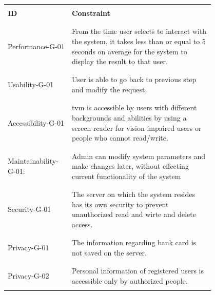 \documentclass[a4paper,12pt]{report}
\begin{document}
\begin{longtable}{ | p{0.2\linewidth} | p{0.6\linewidth} | }
	\hline
	
	 & \\ %
	\centering \textbf{ID}  & \textbf{Constraint} \\
	& \\ %
	\hline
	
	
	& \\ %
	Performance-G-01 & From the time user selects to interact with the system, it takes less than or equal to 5 seconds on average for the system to display the result to that user. \\
	& \\ %
	\hline
	
	& \\ %
	Usability-G-01 & User is able to go back to previous step and modify the request. \\
		& \\ %
	\hline
	
	& \\ %
	Accessibility-G-01 & \gls{tvm} is accessible by users with different backgrounds and abilities by using a screen reader for vision impaired users or people who cannot read/write. \\
	& \\ %
	\hline
	
	& \\ %
	Maintainability-G-01: & Admin can modify system parameters and make changes later, without effecting current functionality of the system \\
	& \\ %
	\hline
	
	& \\ %
	Security-G-01 & The server on which the system resides has its own security to prevent unauthorized read and wirte and delete access. \\
	& \\ %
	\hline
	
	& \\ %
	Privacy-G-01 & The information regarding bank card is not saved on the server. \\
	& \\ %
	\hline
	
	& \\ %
	Privacy-G-02 & Personal information of registered users is accessible only by authorized people. \\
	& \\ %
	\hline

\end{longtable}
\end{document}
